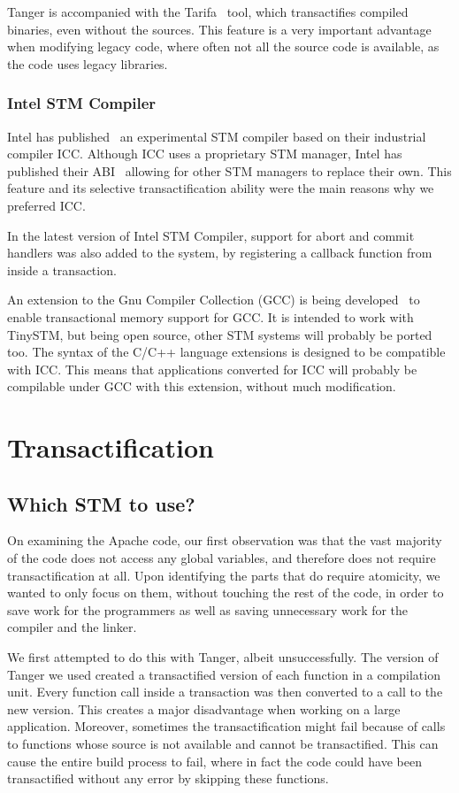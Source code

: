 \documentclass[11pt]{sigplanconf}
\let \cite = \citep
\begin{document}
{\sc Tanger} is accompanied with the {\sc Tarifa}~\cite{felber2007tanger}
tool, which transactifies compiled binaries, even without the sources. This
feature is a very important advantage when modifying legacy code, where often
not all the source code is available, as the code uses legacy libraries.

\subsubsection{Intel STM Compiler}

Intel has published~\cite{icc} an experimental STM compiler based on their industrial
compiler ICC. Although ICC uses a proprietary STM manager, Intel has published their
ABI~\cite{icc:abi} allowing for other STM managers to replace their own. This feature
and its selective transactification ability were the main reasons why we
preferred ICC.

In the latest version of Intel STM Compiler, support for abort and commit
handlers was also added to the system, by registering a callback function
from inside a transaction.

An extension to the Gnu Compiler Collection (GCC) is being developed~\cite{gcctm} to
enable transactional memory support for GCC. It is intended to work with
TinySTM, but being open source, other STM systems will probably be ported too.
The syntax of the C/C++ language extensions is designed to be compatible with
ICC. This means that applications converted for ICC will probably be compilable
under GCC with this extension, without much modification.

\section{Transactification}\label{sec:transactification}
\subsection{Which STM to use?}

On examining the Apache code, our first observation was that
the vast majority of the code does not access any global variables,
and therefore does not require transactification at all.
Upon identifying the parts that do require atomicity,
we wanted to only focus on them, without touching
the rest of the code, in order to save work for the programmers
as well as saving unnecessary work for the compiler and the linker.

We first attempted to do this with {\sc Tanger}, albeit unsuccessfully.
The version of {\sc Tanger} we used
created a transactified version of each function in a compilation
unit.  Every function call inside a transaction was then converted to a call to
the new version. This creates a major disadvantage when working on a large
application. Moreover, sometimes the
transactification might fail because of calls to functions whose source is not
available and cannot be transactified. This can cause the entire build process
to fail, where in fact the code could have been transactified without any error
by skipping these functions.
\end{document}
